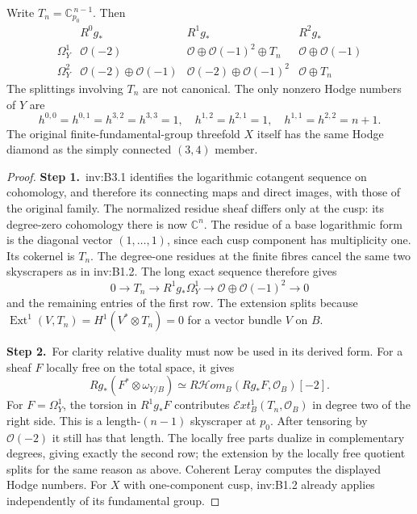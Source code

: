 \begin{theorem}\label{inv:B3.2}
Write $T_n=\mathbb C_{p_0}^{\,n-1}$. Then
\[
\begin{array}{c|ccc}
 &R^0g_*&R^1g_*&R^2g_*\\\hline
\Omega^1_Y&\mathcal O(-2)&\mathcal O\oplus\mathcal O(-1)^2\oplus T_n&\mathcal O\oplus\mathcal O(-1)\\
\Omega^2_Y&\mathcal O(-2)\oplus\mathcal O(-1)&\mathcal O(-2)\oplus\mathcal O(-1)^2&\mathcal O\oplus T_n
\end{array}
\]
The splittings involving $T_n$ are not canonical.
The only nonzero Hodge numbers of $Y$ are
\[
h^{0,0}=h^{0,1}=h^{3,2}=h^{3,3}=1,\quad
h^{1,2}=h^{2,1}=1,\quad h^{1,1}=h^{2,2}=n+1.
\]
The original finite-fundamental-group threefold $X$ itself has the
same Hodge diamond as the simply connected $(3,4)$ member.
\end{theorem}

\begin{proof}
\par\smallskip\noindent\textbf{Step 1.}\ inv:B3.1 identifies the logarithmic cotangent sequence on cohomology,
and therefore its connecting maps and direct images, with those of
the original family. The normalized residue sheaf differs only at
the cusp: its degree-zero cohomology there is now $\mathbb C^n$.
The residue of a base logarithmic form is the diagonal vector
$(1,\ldots,1)$, since each cusp component has multiplicity one.
Its cokernel is $T_n$. The degree-one residues at the finite fibres
cancel the same two skyscrapers as in inv:B1.2. The long exact sequence
therefore gives
\[
0\longrightarrow T_n\longrightarrow R^1g_*\Omega^1_Y
\longrightarrow\mathcal O\oplus\mathcal O(-1)^2\longrightarrow0
\]
and the remaining entries of the first row. The extension splits
because $\operatorname{Ext}^1(V,T_n)=H^1(V^*\otimes T_n)=0$
for a vector bundle $V$ on $B$.

\par\smallskip\noindent\textbf{Step 2.}\ For clarity relative duality must now be used in its derived form.
For a sheaf $F$ locally free on the total space, it gives
\[
Rg_*(F^*\otimes\omega_{Y/B})
\simeq R\mathcal Hom_B(Rg_*F,\mathcal O_B)[-2].
\]
For $F=\Omega^1_Y$, the torsion in $R^1g_*F$ contributes
$\mathcal Ext^1_B(T_n,\mathcal O_B)$ in degree two of the right side.
This is a length-$(n-1)$ skyscraper at $p_0$. After tensoring by
$\mathcal O(-2)$ it still has that length. The locally free parts dualize
in complementary degrees, giving exactly the second row; the
extension by the locally free quotient splits for the same reason
as above. Coherent Leray computes the displayed Hodge numbers.
For $X$ with one-component cusp, inv:B1.2 already applies independently
of its fundamental group.
\end{proof}

